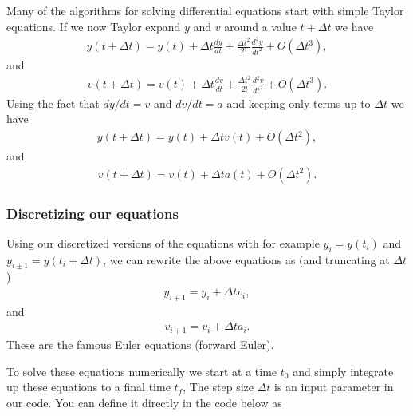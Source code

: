 \documentclass[letterpaper,10pt,english]{sphinxmanual}
\begin{document}
Many of the algorithms for solving differential equations start with simple Taylor equations.
If we now Taylor expand \(y\) and \(v\) around a value \(t+\Delta t\) we have
\begin{equation*}
\begin{split}
y(t+\Delta t) = y(t)+\Delta t \frac{dy}{dt}+\frac{\Delta t^2}{2!} \frac{d^2y}{dt^2}+O(\Delta t^3),
\end{split}
\end{equation*}
and
\begin{equation*}
\begin{split}
v(t+\Delta t) = v(t)+\Delta t \frac{dv}{dt}+\frac{\Delta t^2}{2!} \frac{d^2v}{dt^2}+O(\Delta t^3).
\end{split}
\end{equation*}
Using the fact that \(dy/dt = v\) and \(dv/dt=a\) and keeping only terms up to \(\Delta t\) we have
\begin{equation*}
\begin{split}
y(t+\Delta t) = y(t)+\Delta t v(t)+O(\Delta t^2),
\end{split}
\end{equation*}
and
\begin{equation*}
\begin{split}
v(t+\Delta t) = v(t)+\Delta t a(t)+O(\Delta t^2).
\end{split}
\end{equation*}

\subsubsection{Discretizing our equations}
\label{\detokenize{chapter2:discretizing-our-equations}}
Using our discretized versions of the equations with for example
\(y_{i}=y(t_i)\) and \(y_{i\pm 1}=y(t_i+\Delta t)\), we can rewrite the
above equations as (and truncating at \(\Delta t\))
\begin{equation*}
\begin{split}
y_{i+1} = y_i+\Delta t v_i,
\end{split}
\end{equation*}
and
\begin{equation*}
\begin{split}
v_{i+1} = v_i+\Delta t a_i.
\end{split}
\end{equation*}
These are the famous Euler equations (forward Euler).

To solve these equations numerically we start at a time \(t_0\) and simply integrate up these equations to a final time \(t_f\),
The step size \(\Delta t\) is an input  parameter in our code.
You can define it directly in the code below as
\end{document}
